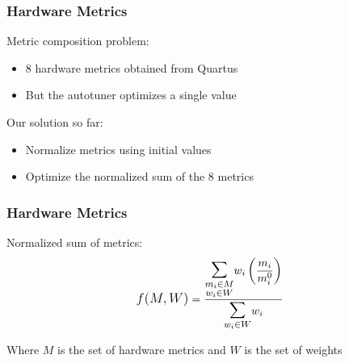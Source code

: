 \documentclass[10pt, compress, xcolor={table,xcdraw,usenames}, aspectratio=169]{beamer}
\begin{document}
\begin{frame}
    \frametitle{Hardware Metrics}
    \begin{block}{\alert{Metric composition} problem:}
        \begin{itemize}
            \item \alert{8 hardware metrics} obtained from Quartus
            \item But the autotuner optimizes \alert{a single value}
        \end{itemize}
    \end{block}

    \pause

    \begin{block}{Our \alert{solution} so far:}
        \begin{itemize}
            \item \alert{Normalize} metrics using initial values
            \item Optimize the \alert{normalized sum} of the 8 metrics
        \end{itemize}
    \end{block}
\end{frame}

\begin{frame}
    \frametitle{Hardware Metrics}
    \begin{block}{\alert{Normalized sum} of metrics:}
        \begin{align*} \label{eq:wnsm}
            \mathlarger{f(M, W)} = \frac{\mathlarger{\mathlarger{\mathlarger{\sum}}}\limits_{\substack{m_i \in M \\ w_i \in W}}{w_i\left(\dfrac{m_i}{m_{i}^{0}}\right)}}{\mathlarger{\mathlarger{\mathlarger{\sum}}}\limits_{w_i \in W}{w_i}}
        \end{align*}

        \begin{center}
            Where $M$ is the set of \alert{hardware metrics} and $W$ is the set
            of \alert{weights}
        \end{center}
    \end{block}
\end{frame}
\end{document}
